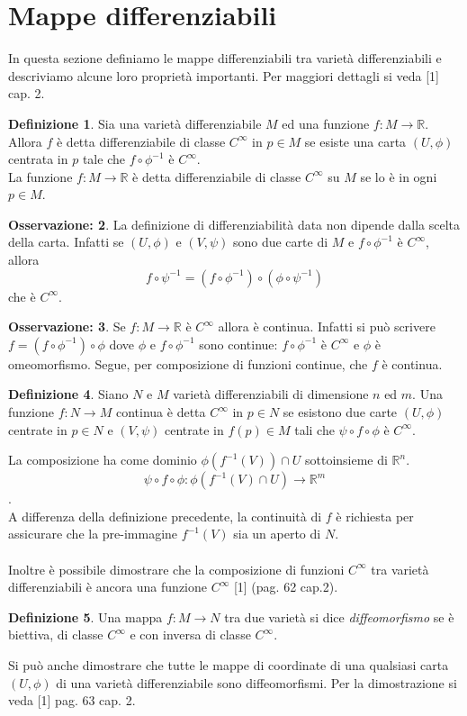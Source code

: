 \documentclass[12pt,a4paper]{report}
\theoremstyle{definition}
\newtheorem{Def}{Definizione}[chapter]
\theoremstyle{definition}
\theoremstyle{definition}
\theoremstyle{definition}
\newtheorem{Obs}[Def]{Osservazione:}
\begin{document}
\section{Mappe differenziabili}
In questa sezione definiamo le mappe differenziabili tra varietà differenziabili e descriviamo alcune loro proprietà importanti. Per maggiori dettagli si veda [1] cap. 2.
\begin{Def}
	Sia una varietà differenziabile $M$ ed una funzione $f:M\rightarrow\mathbb{R}$. Allora $f$ è detta differenziabile di classe $C^\infty$ in $p\in M$ se esiste una carta $(U,\phi)$ centrata in $p$ tale che $f\circ \phi^{-1}$ è $C^\infty$.\\
	La funzione $f:M\rightarrow \mathbb{R}$ è detta differenziabile di classe $C^\infty$ su $M$ se lo è in ogni $p\in M$.
\end{Def}
\begin{Obs}
	La definizione di differenziabilità data non dipende dalla scelta della carta. Infatti se $(U,\phi)$ e $(V,\psi)$ sono due carte di $M$ e $f\circ\phi^{-1}$ è $C^\infty$, allora $$f\circ\psi^{-1}=(f\circ\phi^{-1})\circ(\phi\circ\psi^{-1})$$ che è $C^\infty$.
\end{Obs}
\begin{Obs}
	Se $f:M\rightarrow \mathbb{R}$ è $C^\infty$ allora è continua. Infatti si può scrivere $f=(f\circ\phi^{-1})\circ \phi$ dove $\phi$ e $f\circ\phi^{-1}$ sono continue: $f\circ\phi^{-1}$ è $C^\infty$ e $\phi$ è omeomorfismo. Segue, per composizione di funzioni continue, che $f$ è continua.\\
\end{Obs}
\begin{Def}
	Siano $N$ e $M$ varietà differenziabili di dimensione $n$ ed $m$. Una funzione $f:N\rightarrow M$ continua è detta $C^\infty$ in $p\in N$ se esistono due carte $(U,\phi)$ centrate in $p\in N$ e $(V,\psi)$ centrate in $f(p)\in M$ tali che $\psi\circ f\circ \phi$ è $C^\infty$.
\end{Def}
La composizione ha come dominio $\phi(f^{-1}(V))\cap U$ sottoinsieme di $\mathbb{R}^n$. $$\psi\circ f\circ \phi:\phi(f^{-1}(V)\cap U)\rightarrow \mathbb{R}^m$$.\\
A differenza della definizione precedente, la continuità di $f$ è richiesta per assicurare che la pre-immagine $f^{-1}(V)$ sia un aperto di $N$.\\
\\
Inoltre è possibile dimostrare che la composizione di funzioni $C^\infty$ tra varietà differenziabili è ancora una funzione $C^\infty$ [1] (pag. 62 cap.2). 
\begin{Def}
	Una mappa $f:M\rightarrow N$ tra due varietà si dice \textit{diffeomorfismo} se è biettiva, di classe $C^\infty$ e con inversa di classe $C^\infty$.
\end{Def}
Si può anche dimostrare che tutte le mappe di coordinate di una qualsiasi carta $(U,\phi)$ di una varietà differenziabile sono diffeomorfismi. Per la dimostrazione si veda [1] pag. 63 cap. 2.
\end{document}
